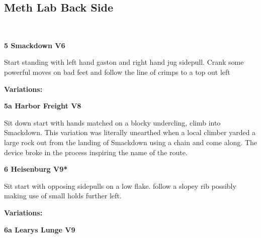 \begin{multicols}{2}
			\begin{minipage}{\columnwidth}
			\subsection*{Meth Lab Back Side}\label{bf:Meth Lab Back Side}
			\
			
\label{pt:Octernal}
			\end{minipage}
			
					\begin{minipage}{\linewidth}	
					\label{rt:Smackdown}
\colorbox{RoyalBlue!20}{
\parbox{0.95\textwidth}{
\textbf{
5 Smackdown V6    
}
}
}

					\begin{adjustwidth}{0.5cm}{}				
					Start standing with left hand gaston and right hand jug sidepull. Crank some powerful moves on bad feet and follow the line of crimps to a top out left
					\end{adjustwidth}
					\end{minipage}
						\begin{adjustwidth}{0.5cm}{}				
						\textbf{Variations:} \newline
							\begin{minipage}{\linewidth}	
							\label{vr:Harbor Freight}
\colorbox{Goldenrod!50}{
\parbox{0.95\textwidth}{
\textbf{
5a Harbor Freight V8     
}
}
}

							\begin{adjustwidth}{0.5cm}{}				
							Sit down start with hands matched on a blocky undercling, climb into Smackdown. This variation was literally unearthed when a local climber yarded a large rock out from the landing of Smackdown using a chain and come along. The device broke in the process inspiring the name of the route.
							\end{adjustwidth}
							\end{minipage}
						\end{adjustwidth}
					\begin{minipage}{\linewidth}	
					\label{rt:Heisenburg}
\colorbox{Goldenrod!50}{
\parbox{0.95\textwidth}{
\textbf{
6 Heisenburg V9*  
}
}
}

					\begin{adjustwidth}{0.5cm}{}				
					Sit start with opposing sidepulls on a low flake. follow a slopey rib possibly making use of small holds further left.
					\end{adjustwidth}
					\end{minipage}
						\begin{adjustwidth}{0.5cm}{}				
						\textbf{Variations:} \newline
							\begin{minipage}{\linewidth}	
							\label{vr:Learys Lunge}
\colorbox{Goldenrod!50}{
\parbox{0.95\textwidth}{
\textbf{
6a Learys Lunge V9     
}
}
}


\end{minipage}
\end{adjustwidth}
\end{multicols}
